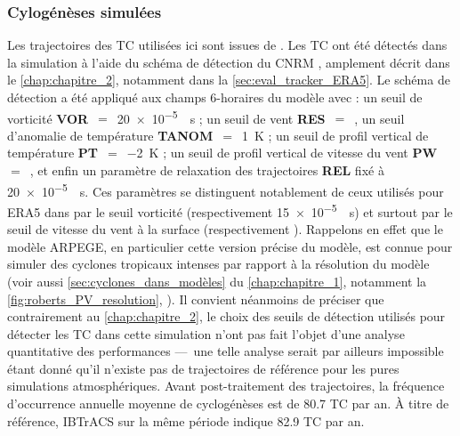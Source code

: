 \documentclass[../main.tex]{subfiles}
\begin{document}
\subsubsection{Cylogénèses simulées}\label{sec:tracking_arpege}

Les trajectoires des TC utilisées ici sont issues de \textcite{cattiaux_projected_2020}. Les TC ont été détectés dans la simulation à l'aide du schéma de
détection du CNRM \parencite{chauvin_response_2006}, amplement décrit dans le \cref{chap:chapitre_2}, notamment dans la \cref{sec:eval_tracker_ERA5}. Le schéma
de détection a été appliqué aux champs 6-horaires du modèle avec : un seuil de vorticité \textbf{VOR}~$=$~\SI{20e-5}{\per\second} ; un seuil de vent
\textbf{RES}~$=$~, un seuil d'anomalie de température \textbf{TANOM}~$=$~\SI{1}{\kelvin} ; un seuil de profil vertical de température
\textbf{PT}~$=$~\SI{-2}{\kelvin} ; un seuil de profil vertical de vitesse du vent \textbf{PW}~$=$~, et enfin un paramètre de relaxation des trajectoires
\textbf{REL} fixé à \SI{20e-5}{\per\second}. Ces paramètres se distinguent notablement de ceux utilisés pour ERA5 dans \textcite{dulac_assessing_2023} par le
seuil vorticité (respectivement \SI{15e-5}{\per\second}) et surtout par le seuil de vitesse du vent à la surface (respectivement ). Rappelons en effet que
le modèle ARPEGE, en particulier cette version précise du modèle, est connue pour simuler des cyclones tropicaux intenses par rapport à la résolution du modèle
\parencite{roberts_impact_2020,chauvin_future_2020} (voir aussi \cref{sec:cyclones_dans_modèles} du \cref{chap:chapitre_1}, notamment la
\cref{fig:roberts_PV_resolution}, ). Il convient néanmoins de préciser que contrairement au \cref{chap:chapitre_2}, le choix
des seuils de détection utilisés pour détecter les TC dans cette simulation n'ont pas fait l'objet d'une analyse quantitative des performances ---~une telle
analyse serait par ailleurs impossible étant donné qu'il n'existe pas de trajectoires de référence pour les pures simulations atmosphériques. Avant
post-traitement des trajectoires, la fréquence d'occurrence annuelle moyenne de cyclogénèses est de \num{80.7} TC par an. À titre de référence, IBTrACS sur la
même période indique \num{82.9} TC par an.
\end{document}
